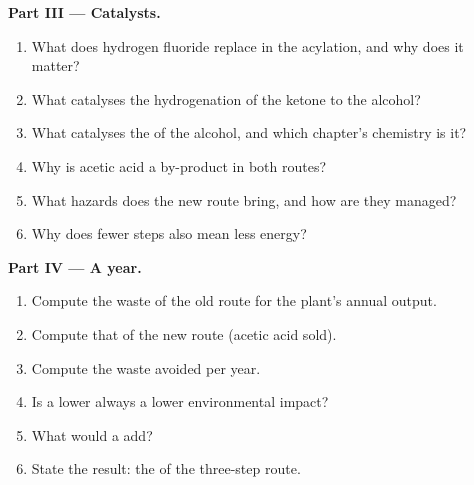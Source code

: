 \begin{problem}
\medskip\noindent\textbf{Part III --- Catalysts.}
\begin{enumerate}[resume]
  \item What does hydrogen fluoride replace in the acylation, and why does it matter?
  \item What catalyses the hydrogenation of the ketone to the alcohol?
  \item What catalyses the  of the alcohol, and which chapter's chemistry
        is it?
  \item Why is acetic acid a by-product in both routes?
  \item What hazards does the new route bring, and how are they managed?
  \item Why does fewer steps also mean less energy?
\end{enumerate}

\medskip\noindent\textbf{Part IV --- A year.}
\begin{enumerate}[resume]
  \item Compute the waste of the old route for the plant's annual output.
  \item Compute that of the new route (acetic acid sold).
  \item Compute the waste avoided per year.
  \item Is a lower  always a lower environmental impact?
  \item What would a  add?
  \item State the result: the  of the three-step route.
\end{enumerate}
\end{problem}
